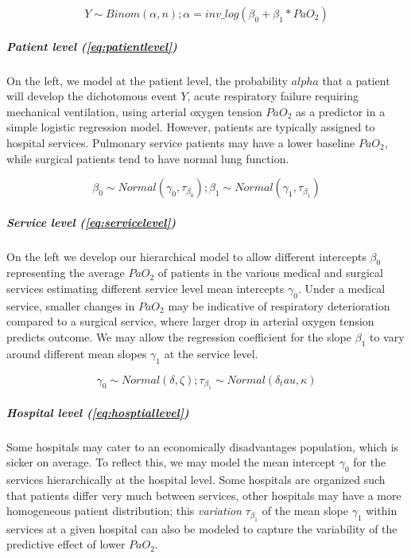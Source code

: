 \documentclass[11pt,notitlepage]{article}
\begin{document}
\begin{figure}
 \begin{equation} \label{eq:patientlevel}
 Y \sim Binom (\alpha, n); \alpha = inv\_log (\beta_{0} +\beta_{1} * PaO_2)
 \end{equation}
\vspace{-25pt}
\end{figure}

\subparagraph*{Patient level (\ref{eq:patientlevel})}
On the left, we model at the patient level, the probability $alpha$ that a patient will develop the dichotomous event $Y$, acute respiratory failure requiring mechanical ventilation, using arterial oxygen tension $PaO_{2}$ as a predictor in a simple logistic regression model. However, patients are typically assigned to hospital services. Pulmonary service patients may have a lower baseline $PaO_2$, while surgical patients tend to have normal lung function. 

\begin{figure}
\begin{equation} \label{eq:servicelevel}
 \beta_{0} \sim Normal (\gamma_0 , \tau_{\beta_0}); \beta_{1} \sim Normal (\gamma_1, \tau_{\beta_1})
\end{equation}
\end{figure}

\subparagraph*{Service level (\ref{eq:servicelevel})}
On the left we develop our hierarchical model to allow different intercepts $\beta_{0}$ representing the average $PaO_2$ of patients in the various medical and surgical services estimating different service level mean intercepts $\gamma_0$. Under a medical service, smaller changes in $PaO_2$ may be indicative of respiratory deterioration compared to a surgical service, where larger drop in arterial oxygen tension predicts outcome. We may allow the regression coefficient for the slope $\beta_{1}$ to vary around different mean slopes $\gamma_1$ at the service level. 

\begin{figure}
\begin{equation} \label{eq:hosptiallevel}
\gamma_0 \sim Normal (\delta, \zeta); \tau_{\beta_1} \sim Normal(\delta_tau, \kappa) 
\end{equation}
\end{figure}

\subparagraph*{Hospital level (\ref{eq:hosptiallevel})}
Some hospitals may cater to an economically disadvantages population, which is sicker on average. To reflect this, we may  model the mean intercept $\gamma_0$ for the services hierarchically at the hospital level. Some hospitals are organized such that patients differ very much between services, other hospitals may have a more homogeneous patient distribution; this \textit{variation} $\tau_{\beta_1}$ of the mean slope $\gamma_1$ within services at a given hospital can also be modeled to capture the variability of the predictive effect of lower $PaO_2$.
 
\end{document}
